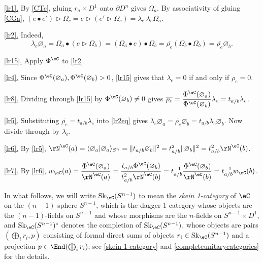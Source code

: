 \documentclass[12pt,reqno]{amsart}
\newcommand{\Sk}{\mathrm{Sk}}
\newcommand{\psn}{\Phi}
\newcommand{\C}{\eC}
\newcommand{\blt}{\bullet}
\newcommand{\bkt}[2]{\langle #1|#2 \rangle}
\newcommand{\defn}[1]{\emph{#1}}
\newcommand{\cent}{\textup{\textcent}}
\newcommand{\itemstep}[1]{\smallskip\noindent\underline{#1}}
\begin{document}
\begin{pf}
\itemstep{\ref{lr1}.} By \ref{CTc}, gluing $r_a\times D^1$ onto $\partial D^n$ gives $\Omega_a$. By associativity of gluing \ref{CGa}, $(e\blt e')\triangleright\Omega_c=e\triangleright(e'\triangleright\Omega_c)=\lambda_{e'}\lambda_e\Omega_a$.

\itemstep{\ref{lr2}.} Indeed, 
\begin{equation}\label{lr2eq}
\lambda_e\varnothing_a
=\Omega_a\blt(e\triangleright\Omega_b)
=(\Omega_a\blt e)\blt\Omega_b
=\overline{\rho_e}(\Omega_b\blt\Omega_b)
=\overline{\rho_e}\varnothing_b.
\end{equation}

\itemstep{\ref{lr15}.} Apply $\psn^\C$ to \ref{lr2}.

\itemstep{\ref{lr4}.} Since $\psn^\C(\varnothing_a),\psn^\C(\varnothing_b)>0$, \ref{lr15} gives that $\lambda_e=0$ if and only if $\rho_e=0$.

\itemstep{\ref{lr8}.} Dividing through \ref{lr15} by $\psn^\C(\varnothing_b)\neq0$ gives $\displaystyle\overline{\rho_e}=\frac{\psn^\C(\varnothing_a)}{\psn^\C(\varnothing_b)}\lambda_e=t_{a/b}\lambda_e$.

\itemstep{\ref{lr5}.} Substituting $\overline{\rho_e}=t_{a/b}\lambda_e$ into \eqref{lr2eq} gives $\lambda_e\varnothing_a=\overline{\rho_e}\varnothing_b=t_{a/b}\lambda_e\varnothing_b$. Now divide through by $\lambda_e$.

\itemstep{\ref{lr6}.}
By \ref{lr5}, $\rN^\C(a)=\bkt{\varnothing_a}{\varnothing_a}_{S^n}=\Vert{}t_{a/b}\varnothing_b\Vert{}^2=t_{a/b}^2\Vert{}\varnothing_b\Vert{}^2=t_{a/b}^2\rN^\C(b)$.

\itemstep{\ref{lr7}.} By \ref{lr6}, $\displaystyle w_\C(a)=\frac{\psn^\C(\varnothing_a)}{\rN^\C(a)}=\frac{t_{a/b}\psn^\C(\varnothing_b)}{t_{a/b}^2\rN^\C(b)}=t_{a/b}^{-1}\frac{\psn^\C(\varnothing_b)}{\rN^\C(b)}=t_{a/b}^{-1}w_\C(b)$.
\end{pf}

In what follows, we will write $\Sk_\C(S^{n-1})$ to mean the \defn{skein 1-category} of $\C$ on the $(n-1)$-sphere $S^{n-1}$, which is the dagger 1-category whose objects are the $(n-1)$-fields on $S^{n-1}$ and whose morphisms are the $n$-fields on $S^{n-1}\times D^1$, and $\Sk_\C(S^{n-1})^\cent$ denotes the completion of $\Sk_\C(S^{n-1})$, whose objects are pairs $(\bigoplus_i r_i,p)$ consisting of formal direct sums of objects $r_i\in\Sk_\C(S^{n-1})$ and a projection $p\in\End(\bigoplus_i r_i)$; see \cref{skein 1-category} and \cref{completeunitarycategories} for the details.
\end{document}
